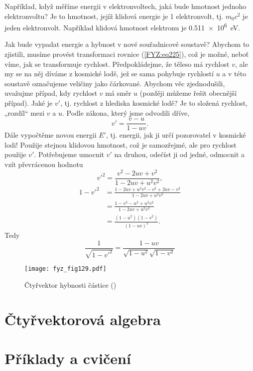 {    Například, když měříme energii v elektronvoltech, jaká bude hmotnost jednoho elektronvoltu? Je 
    to hmotnost, jejíž klidová energie je \num{1} elektronvolt, tj. \(m_0c^2\) je jeden 
    elektronvolt. Například klidová hmotnost elektronu je \SI{0.511e6}{\electronvolt}.
    
    Jak bude vypadat energie a hybnost v nové souřadnicové soustavě? Abychom to zjistili, musíme 
    provést transformaci rovnice (\ref{FYZ:eq225}), což je možné, neboť víme, jak se transformuje 
    rychlost. Předpokládejme, že těleso má rychlost \(v\), ale my se na něj díváme z kosmické lodě, 
    jež se sama pohybuje rychlostí \(u\) a v této soustavě označujeme veličiny jako čárkované. 
    Abychom věc zjednodušili, uvažujme případ, kdy rychlost \(v\) má směr \(u\) (později můžeme 
    řešit obecnější případ). Jaké je \(v'\), tj. rychlost z hlediska kosmické lodě? Je to složená 
    rychlost, „rozdíl“ mezi \(v\) a \(u\). Podle zákona, který jsme odvodili dříve,
    \begin{equation}\label{FYZ:eq227}
      v' = \frac{v-u}{1-uv}.
    \end{equation}
    Dále vypočtěme novou energii \(E'\), tj. energii, jak ji určí pozorovatel v kosmické lodi! 
    Použije stejnou klidovou hmotnost, což je samozřejmé, ale pro rychlost použije \(v'\). 
    Potřebujeme umocnit \(v'\) na druhou, odečíst ji od jedné, odmocnit a vzít převrácenou hodnotu
    \begin{equation*}
      {v'}^2 = \frac{v^2 - 2uv + v^2}{1 - 2uv + u^2v^2},
    \end{equation*}
    \begin{align*}
      1 - {v'}^2 &= \frac{1 - 2uv + u^2v^2 - v^2 + 2uv - v^2}{1 - 2uv + u^2v^2}  \\
                 &= \frac{1 - v^2 - u^2 + u^2v^2}{1 - 2uv + u^2v^2}              \\
                 &= \frac{(1-u^2)(1-v^2)}{(1 - uv)^2}.
    \end{align*}
    Tedy
    \begin{equation}\label{FYZ:eq228}
      \frac{1}{\sqrt{1 - {v'}^2}} = \frac{1-uv}{\sqrt{1-u^2}\sqrt{1-v^2}}
    \end{equation}
    
    \begin{figure}[ht!] %
      \centering
      \texttt{[image: fyz\_fig129.pdf]}
      \caption{Čtyřvektor hybnosti částice
               (\cite[s.~244]{Feynman01})}
      \label{fyz_fig129}
    \end{figure}
    
  \section{Čtyřvektorová algebra}\label{fyz:IchapXVIIsecV}
  \section{Příklady a cvičení}\label{fyz:IchapXVIIsecVI}

} %
\printbibliography[title={Seznam literatury}, heading=subbibliography]
